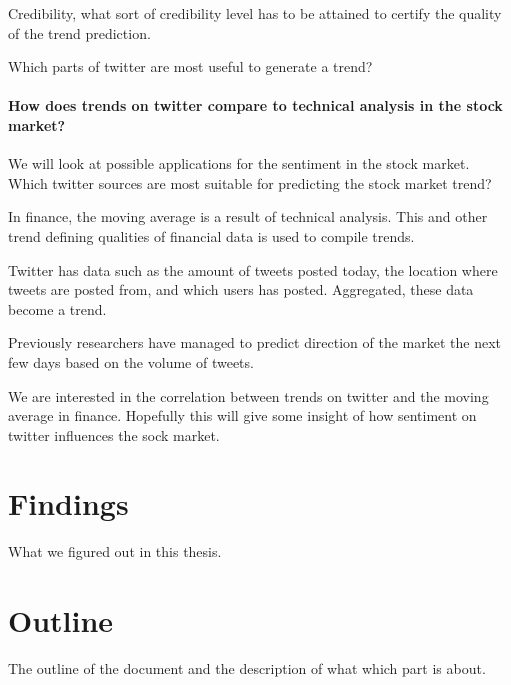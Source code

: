 Credibility, what sort of credibility level has to be attained to certify the
quality of the trend prediction. 

Which parts of twitter are most useful to generate a trend?

\paragraph{How does trends on twitter compare to technical analysis in the
stock market?\\}
We will look at possible applications for the sentiment in the stock market.
Which twitter sources are most suitable for predicting the stock market
trend?

In finance, the moving average is a result of technical analysis. This and
other trend defining qualities of financial data is used to compile trends. 

Twitter has data such as the amount of tweets posted today, the location where
tweets are posted from, and which users has posted. Aggregated, these data
become a trend. 

Previously researchers have managed to predict direction of the market the
next few days based on the volume of tweets. 

We are interested in the correlation between trends on twitter and the moving
average in finance. Hopefully this will give some insight of how sentiment on
twitter influences the sock market.  

\section{Findings}
What we figured out in this thesis. 

\section{Outline}
The outline of the document and the description of what which part is about. 


